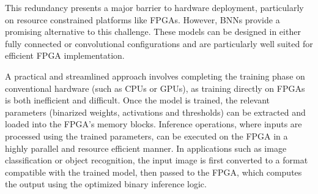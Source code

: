 \documentclass[a4paper,12pt]{report}
\begin{document}
This redundancy presents a major barrier to hardware deployment, particularly on resource constrained platforms like FPGAs. However, BNNs provide a promising alternative to this challenge. These models can be designed in either fully connected or convolutional configurations and are particularly well suited for efficient FPGA implementation.

A practical and streamlined approach involves completing the training phase on conventional hardware (such as CPUs or GPUs), as training directly on FPGAs is both inefficient and difficult. Once the model is trained, the relevant parameters (binarized weights, activations and thresholds) can be extracted and loaded into the FPGA’s memory blocks. Inference operations, where inputs are processed using the trained parameters, can be executed on the FPGA in a highly parallel and resource efficient manner. In applications such as image classification or object recognition, the input image is first converted to a format compatible with the trained model, then passed to the FPGA, which computes the output using the optimized binary inference logic.
\end{document}
